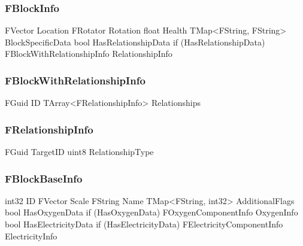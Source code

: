 \subsubsection{FBlockInfo}

\begin{code}
[FBlockBaseInfo]
FVector                                     Location
FRotator                                    Rotation
float                                       Health
TMap<FString, FString>                      BlockSpecificData
bool                                        HasRelationshipData
if (HasRelationshipData)
    FBlockWithRelationshipInfo              RelationshipInfo
\end{code}

\newpage


\subsubsection{FBlockWithRelationshipInfo}
\begin{code}
FGuid                                       ID
TArray<FRelationshipInfo>                   Relationships
\end{code}

\subsubsection{FRelationshipInfo}
\begin{code}
FGuid                                       TargetID
uint8                                       RelationshipType
\end{code}


\subsubsection{FBlockBaseInfo}
\begin{code}
int32                                       ID
FVector                                     Scale
FString                                     Name
TMap<FString, int32>                        AdditionalFlags
bool                                        HasOxygenData
if (HasOxygenData)
    FOxygenComponentInfo                    OxygenInfo
bool                                        HasElectricityData
if (HasElectricityData)
    FElectricityComponentInfo               ElectricityInfo
\end{code}





